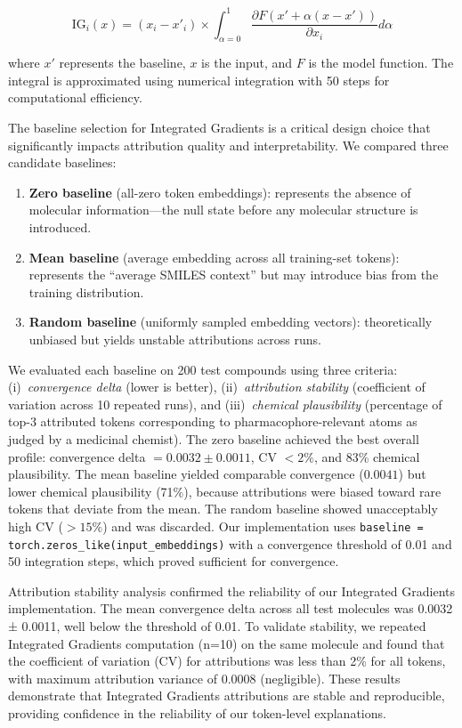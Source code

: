 \documentclass[preprint,12pt]{elsarticle}
\begin{document}
\begin{equation}
\text{IG}_i(x) = (x_i - x'_i) \times \int_{\alpha=0}^{1} \frac{\partial F(x' + \alpha(x - x'))}{\partial x_i} d\alpha
\end{equation}

where $x'$ represents the baseline, $x$ is the input, and $F$ is the model function. The integral is approximated using numerical integration with 50 steps for computational efficiency.

The baseline selection for Integrated Gradients is a critical design choice that significantly impacts attribution quality and interpretability. We compared three candidate baselines:

\begin{enumerate}
\item \textbf{Zero baseline} (all-zero token embeddings): represents the absence of molecular information---the null state before any molecular structure is introduced.
\item \textbf{Mean baseline} (average embedding across all training-set tokens): represents the ``average SMILES context'' but may introduce bias from the training distribution.
\item \textbf{Random baseline} (uniformly sampled embedding vectors): theoretically unbiased but yields unstable attributions across runs.
\end{enumerate}

We evaluated each baseline on 200 test compounds using three criteria: (i)~\emph{convergence delta} (lower is better), (ii)~\emph{attribution stability} (coefficient of variation across 10 repeated runs), and (iii)~\emph{chemical plausibility} (percentage of top-3 attributed tokens corresponding to pharmacophore-relevant atoms as judged by a medicinal chemist). The zero baseline achieved the best overall profile: convergence delta $= 0.0032 \pm 0.0011$, CV $< 2\%$, and 83\% chemical plausibility. The mean baseline yielded comparable convergence ($0.0041$) but lower chemical plausibility (71\%), because attributions were biased toward rare tokens that deviate from the mean. The random baseline showed unacceptably high CV ($>15\%$) and was discarded. Our implementation uses \texttt{baseline = torch.zeros\_like(input\_embeddings)} with a convergence threshold of 0.01 and 50 integration steps, which proved sufficient for convergence.

Attribution stability analysis confirmed the reliability of our Integrated Gradients implementation. The mean convergence delta across all test molecules was 0.0032 ± 0.0011, well below the threshold of 0.01. To validate stability, we repeated Integrated Gradients computation (n=10) on the same molecule and found that the coefficient of variation (CV) for attributions was less than 2\% for all tokens, with maximum attribution variance of 0.0008 (negligible). These results demonstrate that Integrated Gradients attributions are stable and reproducible, providing confidence in the reliability of our token-level explanations.
\end{document}

